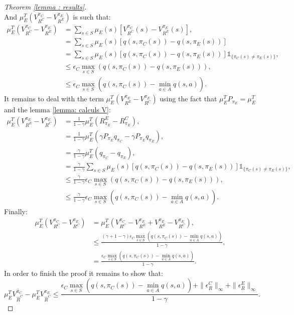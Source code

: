 \documentclass{llncs}
\newcommand{\0}{\mathbf{0}}
\newcommand{\1}{\mathbf{1}}
\begin{document}
\begin{proof}[Theorem \ref{lemma : results}]
\begin{equation}
\end{equation}
And $\mu_E^T(V^{\pi_C}_{R^C}-V^{\pi_E}_{R^E})$ is such that:
\begin{align}
\mu_E^T(V^{\pi_C}_{R^C}-V^{\pi_E}_{R^E})&=\sum_{s\in S}\mu_E(s)[V^{\pi_C}_{R^C}(s)-V^{\pi_E}_{R^E}(s)],
\\
&=\sum_{s\in S}\mu_E(s)[q(s,\pi_C(s))-q(s,\pi_E(s))]
\\
&=\sum_{s\in S}\mu_E(s)[q(s,\pi_C(s))-q(s,\pi_E(s))]\mathds{1}_{\{\pi_C(s)\neq\pi_E(s)\}},
\\
&\leq\epsilon_C\max_{s\in S}(q(s,\pi_C(s))-q(s,\pi_E(s))),
\\
&\leq\epsilon_C\max_{s\in S}(q(s,\pi_C(s))-\min_{a\in A}q(s,a)).
\end{align}
It remains to deal with the term $\mu_E^T(V^{\pi_E}_{R^E}-V^{\pi_E}_{R^C})$ using the fact that $\mu_E^TP_{\pi_E}=\mu_E^T$ and the lemma \ref{lemma: calculs V}:
\begin{align}
\mu_E^T(V^{\pi_E}_{R^E}-V^{\pi_E}_{R^C})&=\frac{1}{1-\gamma}\mu_E^T(R^E_{\pi_E}-R^C_{\pi_E}),
\\
&=\frac{1}{1-\gamma}\mu_E^T(\gamma P_{\pi_E}q_{\pi_C}-\gamma P_{\pi_E}q_{\pi_E}),
\\
&=\frac{\gamma}{1-\gamma}\mu_E^T(q_{\pi_C}-q_{\pi_E}),
\\
&=\frac{\gamma}{1-\gamma}\sum_{s\in S}\mu_E(s)[q(s,\pi_C(s))-q(s,\pi_E(s))]\mathds{1}_{\{\pi_C(s)\neq\pi_E(s)\}},
\\
&\leq\frac{\gamma}{1-\gamma}\epsilon_C\max_{s\in S}(q(s,\pi_C(s))-q(s,\pi_E(s))),
\\
&\leq\frac{\gamma}{1-\gamma}\epsilon_C\max_{s\in S}(q(s,\pi_C(s))-\min_{a\in A}q(s,a)).
\end{align}
Finally:
\begin{align}
\mu_E^T(V^{\pi_C}_{R^C}-V^{\pi_E}_{R^C})&=\mu_E^T(V^{\pi_C}_{R^C}-V^{\pi_E}_{R^E}+V^{\pi_E}_{R^E}-V^{\pi_E}_{R^C}),
\\
&\leq\frac{(\gamma+1-\gamma)\epsilon_C\max_{s\in S}(q(s,\pi_C(s))-\min_{a\in A}q(s,a))}{1-\gamma},
\\
&=\frac{\epsilon_C\max_{s\in S}(q(s,\pi_C(s))-\min_{a\in A}q(s,a))}{1-\gamma}.
\end{align}
In order to finish the proof it remains to show that:
\begin{equation}
\mu_E^TV^{\hat{\pi}_C}_{\hat{R}^C}-\mu_E^TV^{\pi_E}_{\hat{R}^C}\leq \frac{\epsilon_C\max_{s\in S}(q(s,\pi_C(s))-\min_{a\in A}q(s,a))+\|\epsilon^C_R\|_{\infty}+\|\epsilon^E_R\|_{\infty}}{1-\gamma}.
\end{equation}

\end{proof}
\end{document}

